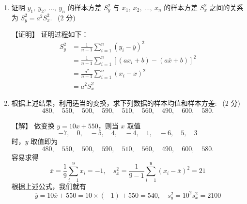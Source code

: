\documentclass[openany]{book}
\begin{document}
\begin{enumerate}
\begin{enumerate}
    \item 证明 $y_1,~y_2,~\ldots,~y_n$ 的样本方差 $S^2_y$ 与
    $x_1,~x_2,~\ldots,~x_n$  的样本方差 $S^2_x$ 之间的关系为
    $S^2_y = a^2S^2_x$.~{\color{cyan} (2 分)}

    {\color{red} \heiti 【证明】} {\color{teal} \kaishu
      证明过程如下：
      \begin{align*}
        S^2_y &= \frac{1}{n-1} \sum^n_{i=1} \left( y_i - \overline{y}
        \right)^2 \\
        &= \frac{1}{n-1} \sum^n_{i=1} \left[ \left( a x_i + b \right)
        - \left( a \overline{x} + b \right) \right]^2 \\
        &= \frac{a^2}{n-1} \sum^n_{i=1} \left( x_i - \overline{x}
        \right)^2 \\
        &= a^2 S^2_x
      \end{align*}
    }

    \item
    根据上述结果，利用适当的变换，求下列数据的样本均值和样本方差:~{\color{cyan}
      (2 分)}
    $$ 480, \quad 550, \quad 500, \quad 590, \quad 510, \quad 560,
    \quad 490, \quad 600, \quad 580. $$

    {\color{red} \heiti 【解】} {\color{teal} \kaishu
      做变换 $y = 10 x + 550$，则当 $x$ 取值
      $$ -7, \quad 0, \quad -5, \quad 4, \quad -4, \quad 1, \quad -6,
      \quad 5, \quad 3 $$
      时，$y$ 取值即为
      $$ 480, \quad 550, \quad 500, \quad 590, \quad 510, \quad 560,
      \quad 490, \quad 600, \quad 580. $$
      容易求得
      $$ \overline{x} = \frac{1}{9} \sum_{i=1}^9 x_i = -1 , \quad
      s^2_x = \frac{1}{9-1} \sum_{i=1}^9 \left( x_i - \overline{x}
      \right)^2 = 21 $$
      根据上述公式，我们就有
      $$ \overline{y} = 10 \overline{x} + 550 = 10 \times (-1) + 550
      = 540 , \quad
      s^2_y = 10^2 s^2_x = 2100 $$
    }
  \end{enumerate}
\end{enumerate}
\end{document}
